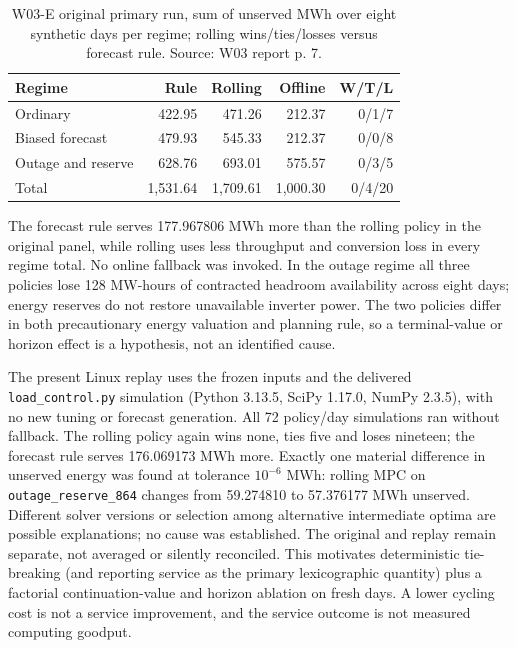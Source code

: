 \documentclass[11pt,letterpaper]{article}
\begin{document}
\begin{table}[htbp]\centering\small
\caption{W03-E original primary run, sum of unserved MWh over eight synthetic days per regime; rolling wins/ties/losses versus forecast rule. Source: W03 report p. 7.}\label{tab:w03e}
\begin{tabular}{lrrrr}\toprule
Regime & Rule & Rolling & Offline & W/T/L\\\midrule
Ordinary &422.95&471.26&212.37&0/1/7\\
Biased forecast &479.93&545.33&212.37&0/0/8\\
Outage and reserve &628.76&693.01&575.57&0/3/5\\\midrule
Total &1,531.64&1,709.61&1,000.30&0/4/20\\\bottomrule\end{tabular}
\end{table}

The forecast rule serves 177.967806 MWh more than the rolling policy in the original panel, while rolling uses less throughput and conversion loss in every regime total. No online fallback was invoked. In the outage regime all three policies lose 128 MW-hours of contracted headroom availability across eight days; energy reserves do not restore unavailable inverter power. The two policies differ in both precautionary energy valuation and planning rule, so a terminal-value or horizon effect is a hypothesis, not an identified cause.

The present Linux replay uses the frozen inputs and the delivered \texttt{load\_control.py} simulation (Python 3.13.5, SciPy 1.17.0, NumPy 2.3.5), with no new tuning or forecast generation. All 72 policy/day simulations ran without fallback. The rolling policy again wins none, ties five and loses nineteen; the forecast rule serves 176.069173 MWh more. Exactly one material difference in unserved energy was found at tolerance $10^{-6}$ MWh: rolling MPC on \texttt{outage\_reserve\_864} changes from 59.274810 to 57.376177 MWh unserved. Different solver versions or selection among alternative intermediate optima are possible explanations; no cause was established. The original and replay remain separate, not averaged or silently reconciled. This motivates deterministic tie-breaking (and reporting service as the primary lexicographic quantity) plus a factorial continuation-value and horizon ablation on fresh days. A lower cycling cost is not a service improvement, and the service outcome is not measured computing goodput.
\end{document}

